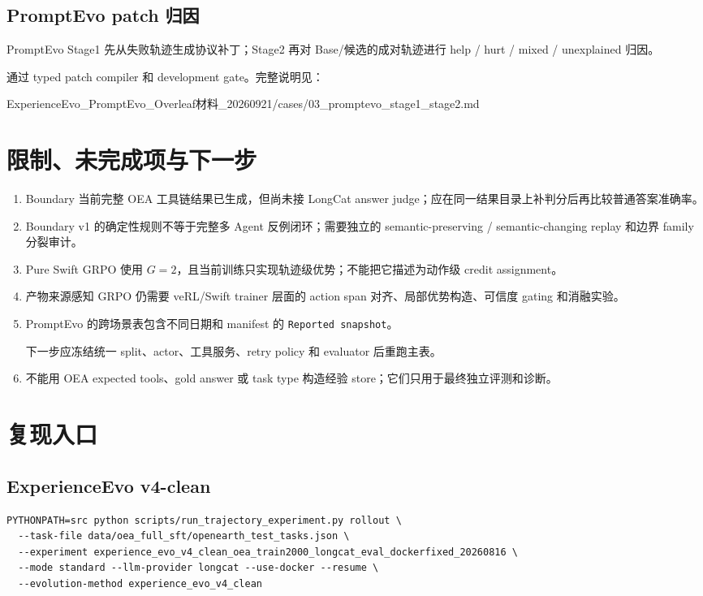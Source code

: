\documentclass[a4paper,11pt]{article}
\newcommand{\source}[1]{\begingroup\scriptsize\CJKfamily{gbsn}#1\endgroup}
\begin{document}
\begin{CJK*}{UTF8}{gbsn}
\subsection{PromptEvo patch 归因}

PromptEvo Stage1 先从失败轨迹生成协议补丁；Stage2 再对 Base/候选的成对轨迹进行 help / hurt / mixed / unexplained 归因。

通过 typed patch compiler 和 development gate。完整说明见：

\source{ExperienceEvo\_PromptEvo\_Overleaf材料\_20260921/cases/03\_promptevo\_stage1\_stage2.md}

\section{限制、未完成项与下一步}

\begin{enumerate}
  \item Boundary 当前完整 OEA 工具链结果已生成，但尚未接 LongCat answer judge；应在同一结果目录上补判分后再比较普通答案准确率。
  \item Boundary v1 的确定性规则不等于完整多 Agent 反例闭环；需要独立的 semantic-preserving / semantic-changing replay 和边界 family 分裂审计。
  \item Pure Swift GRPO 使用 $G=2$，且当前训练只实现轨迹级优势；不能把它描述为动作级 credit assignment。
  \item 产物来源感知 GRPO 仍需要 veRL/Swift trainer 层面的 action span 对齐、局部优势构造、可信度 gating 和消融实验。
  \item PromptEvo 的跨场景表包含不同日期和 manifest 的 \texttt{Reported snapshot}。

  下一步应冻结统一 split、actor、工具服务、retry policy 和 evaluator 后重跑主表。
  \item 不能用 OEA expected tools、gold answer 或 task type 构造经验 store；它们只用于最终独立评测和诊断。
\end{enumerate}

\section{复现入口}

\subsection{ExperienceEvo v4-clean}

\begin{lstlisting}[basicstyle=\scriptsize\ttfamily,breaklines=true]
PYTHONPATH=src python scripts/run_trajectory_experiment.py rollout \
  --task-file data/oea_full_sft/openearth_test_tasks.json \
  --experiment experience_evo_v4_clean_oea_train2000_longcat_eval_dockerfixed_20260816 \
  --mode standard --llm-provider longcat --use-docker --resume \
  --evolution-method experience_evo_v4_clean
\end{lstlisting}


\end{CJK*}
\end{document}
